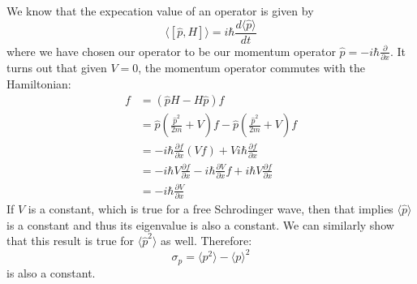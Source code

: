 \begin{sol}
We know that the expecation value of an operator is given by
$$\langle [\hat{p},H] \rangle = i\hbar \frac{d\langle \hat{p}\rangle}{dt}$$
where we have chosen our operator to be our momentum operator $\hat{p}=-i\hbar \frac{\partial}{\partial x}$. It turns out that given $V=0$, the momentum operator commutes with the Hamiltonian:
\begin{align*}
    [\hat p,H]f &= (\hat pH - H\hat p)f \\
    &= \hat p \left(\frac{\hat{p}^2}{2m}+V\right)f - \hat p \left(\frac{\hat{p}^2}{2m}+V\right)f \\
    &= -i\hbar \frac{\partial f}{\partial x}(Vf) + Vi\hbar \frac{\partial f}{\partial x} \\
    &= -i\hbar V\frac{\partial f}{\partial x}-i\hbar \frac{\partial V}{\partial x}f + i\hbar V\frac{\partial f}{\partial x} \\
    &= -i\hbar \frac{\partial V}{\partial x}
\end{align*}
If $V$ is a constant, which is true for a free Schrodinger wave, then that implies $\langle \hat{p} \rangle$ is a constant and thus its eigenvalue is also a constant. We can similarly show that this result is true for $\langle \hat{p}^2 \rangle$ as well. Therefore:
$$\sigma_p = \langle p^2 \rangle - \langle p \rangle ^2$$
is also a constant.
\end{sol}